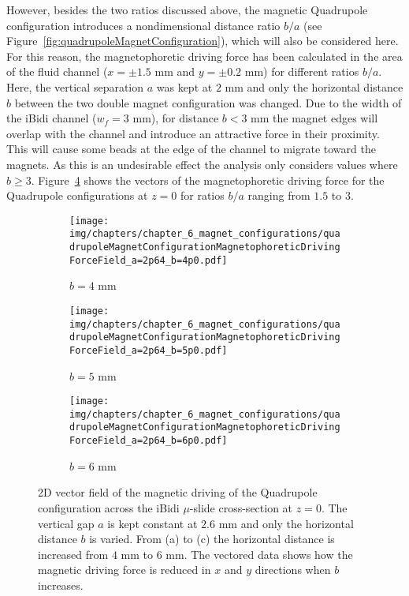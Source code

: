 However, besides the two ratios discussed above, the magnetic Quadrupole configuration introduces a nondimensional distance ratio $b/a$ (see Figure~\ref{fig:quadrupoleMagnetConfiguration}), which will also be considered here. For this reason, the magnetophoretic driving force has been calculated in the area of the fluid channel ($x = \pm 1.5$ mm and $y = \pm0.2$ mm) for different ratios $b/a$. Here, the vertical separation $a$ was kept at $2$ mm and only the horizontal distance $b$ between the two double magnet configuration was changed. Due to the width of the iBidi channel ($w_{f}=3$ mm), for distance $b<3$ mm the magnet edges will overlap with the channel and introduce an attractive force in their proximity. This will cause some beads at the edge of the channel to migrate toward the magnets. As this is an undesirable effect the analysis only considers values where $b\geq3$. Figure~\ref{fig:magnetophoreticDrivingForceField} shows the vectors of the magnetophoretic driving force for the Quadrupole configurations at $z=0$ for ratios $b/a$ ranging from $1.5$ to $3$. 

\begin{figure}[htb]
\centering
	\begin{subfigure}[b]{0.9\textwidth}
		\texttt{[image: img/chapters/chapter\_6\_magnet\_configurations/quadrupoleMagnetConfigurationMagnetophoreticDrivingForceField\_a=2p64\_b=4p0.pdf]}
	\caption{$b=4$ mm}
    \label{fig:magnetophoreticDrivingForceField_3mm}
    \end{subfigure}
    \hfill
	\begin{subfigure}[b]{0.9\textwidth}
		\texttt{[image: img/chapters/chapter\_6\_magnet\_configurations/quadrupoleMagnetConfigurationMagnetophoreticDrivingForceField\_a=2p64\_b=5p0.pdf]}
	\caption{$b=5$ mm}
	\label{fig:magnetophoreticDrivingForceField_4mm}
	\end{subfigure}
	\hfill
	\begin{subfigure}[b]{0.9\textwidth}
		\texttt{[image: img/chapters/chapter\_6\_magnet\_configurations/quadrupoleMagnetConfigurationMagnetophoreticDrivingForceField\_a=2p64\_b=6p0.pdf]}
	\caption{$b=6$ mm}
	\label{fig:magnetophoreticDrivingForceField_5mm}
	\end{subfigure}
\caption[Vector field of the magnetic driving force of the Quadrupole configuration across the iBidi $\mu$-slide]{2D vector field of the magnetic driving of the Quadrupole configuration across the iBidi $\mu$-slide cross-section at $z=0$. The vertical gap $a$ is kept constant at $2.6$ mm and only the horizontal distance $b$ is varied. From (a) to (c) the horizontal distance is increased from $4$ mm to $6$ mm. The vectored data shows how the magnetic driving force is reduced in $x$ and $y$ directions when $b$ increases.}
\label{fig:magnetophoreticDrivingForceField}
\end{figure}

